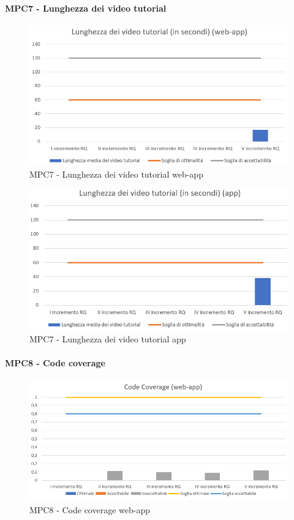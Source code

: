   \clearpage
  \paragraph{MPC7 - Lunghezza dei video tutorial}
  \begin{figure}[h!]
    \centering
      \includegraphics[scale=1]{Immagini/lunghVideoTut WA.PNG}
    \caption{MPC7 - Lunghezza dei video tutorial web-app}
  \end{figure}

  \begin{figure}[h!]
    \centering
      \includegraphics[scale=1]{Immagini/lunghVideoTut APP.PNG}
    \caption{MPC7 - Lunghezza dei video tutorial app}
  \end{figure}



  \clearpage
  \paragraph{MPC8 - Code coverage}
  \begin{figure}[h!]
    \centering
      \includegraphics[scale=0.9]{Immagini/CodeCov WA.PNG}
    \caption{MPC8 - Code coverage web-app}
  \end{figure}


